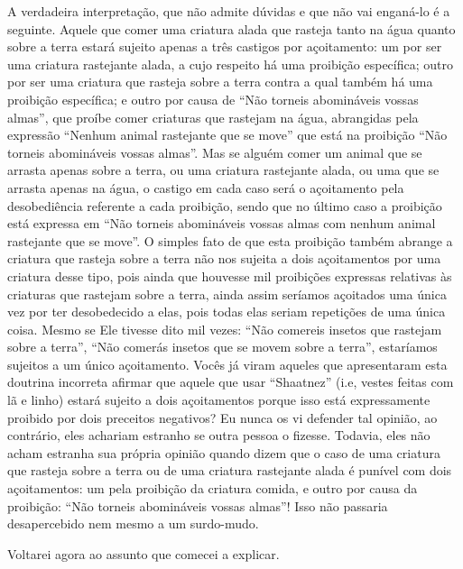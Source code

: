 A verdadeira interpretação, que não admite dúvidas e que não vai
enganá-lo é a seguinte. Aquele que comer uma criatura alada que rasteja
tanto na água quanto sobre a terra estará sujeito apenas a três castigos
por açoitamento: um por ser uma criatura rastejante alada, a cujo
respeito há uma proibição específica; outro por ser uma criatura que
rasteja sobre a terra contra a qual também há uma proibição específica;
e outro por causa de ``Não torneis abomináveis vossas almas'', que
proíbe comer criaturas que rastejam na água, abrangidas pela expressão
``Nenhum animal rastejante que se move'' que está na proibição ``Não
torneis abomináveis vossas almas''. Mas se alguém comer um animal que
se arrasta apenas sobre a terra, ou uma criatura rastejante alada, ou
uma que se arrasta apenas na água, o castigo em cada caso será o
açoitamento pela desobediência referente a cada proibição, sendo que no
último caso a proibição está expressa em ``Não torneis abomináveis
vossas almas com nenhum animal rastejante que se move''. O simples fato
de que esta proibição também abrange a criatura que rasteja sobre a
terra não nos sujeita a dois açoitamentos por uma criatura desse tipo,
pois ainda que houvesse mil proibições expressas relativas às criaturas
que rastejam sobre a terra, ainda assim seríamos açoitados uma única vez
por ter desobedecido a elas, pois todas elas seriam repetições de uma
única coisa. Mesmo se Ele tivesse dito mil vezes: ``Não comereis insetos
que rastejam sobre a terra'', ``Não comerás insetos que se movem sobre a
terra'', estaríamos sujeitos a um único açoitamento. Vocês já viram
aqueles que apresentaram esta doutrina incorreta afirmar que aquele que
usar ``Shaatnez'' (i.e, vestes feitas com lã e linho) estará sujeito a
dois açoitamentos porque isso está expressamente proibido por dois
preceitos negativos? Eu nunca os vi defender tal opinião, ao contrário,
eles achariam estranho se outra pessoa o fizesse. Todavia, eles não
acham estranha sua própria opinião quando dizem que o caso de uma
criatura que rasteja sobre a terra ou de uma criatura rastejante alada é
punível com dois açoitamentos: um pela proibição da criatura comida, e
outro por causa da proibição: ``Não torneis abomináveis vossas almas''!
Isso não passaria desapercebido nem mesmo a um surdo-mudo.

Voltarei agora ao assunto que comecei a explicar.

